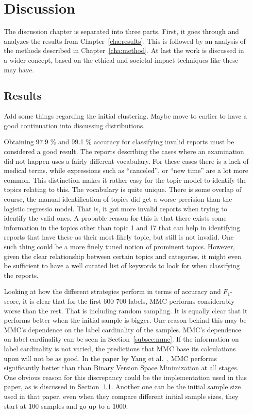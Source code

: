 \chapter{Discussion}
\label{cha:discussion}

The discussion chapter is separated into three parts.
First, it goes through and analyzes the results from Chapter~\ref{cha:results}.
This is followed by an analysis of the methods described in Chapter~\ref{cha:method}.
At last the work is discussed in a wider concept, based on the ethical and societal impact techniques like these may have.

\section{Results}
\label{sec:discussion-results}

Add some things regarding the initial clustering. Maybe move to earlier to have a good continuation into discussing distributions.

Obtaining 97.9 \% and 99.1 \% accuracy for classifying invalid reports must be considered a good result.
The reports describing the cases where an examination did not happen uses a fairly different vocabulary.
For these cases there is a lack of medical terms, while expressions such as ``canceled'', or ``new time'' are a lot more common.
This distinction makes it rather easy for the topic model to identify the topics relating to this.
The vocabulary is quite unique.
There is some overlap of course, the manual identification of topics did get a worse precision than the logistic regressio model.
That is, it got more invalid reports when trying to identify the valid ones.
A probable reason for this is that there exists some information in the topics other than topic 1 and 17 that can help in identifying reports that have these as their most likely topic, but still is not invalid.
One such thing could be a more finely tuned notion of prominent topics.
However, given the clear relationship between certain topics and categories, it might even be sufficient to have a well curated list of keywords to look for when classifying the reports.

Looking at how the different strategies perform in terms of accuracy and $F_1$-score, it is clear that for the first 600-700 labels, MMC performs considerably worse than the rest.
That is including random sampling.
It is equally clear that it performs better when the initial sample is bigger.
One reason behind this may be MMC's dependence on the label cardinality of the samples.
MMC's dependence on label cardinality can be seen in Section~\ref{subsec:mmc}.
If the information on label cardinality is not varied, the predictions that MMC base its calculations upon will not be as good.
In the paper by Yang et al\@.~\cite{yang2009effective}, MMC performs significantly better than than Binary Version Space Minimization at all stages.
One obvious reason for this discrepancy could be the implementation used in this paper, as is discussed in Section~\ref{sec:discussion-results}.
Another one can be the initial sample size used in that paper, even when they compare different initial sample sizes, they start at 100 samples and go up to a 1000.

